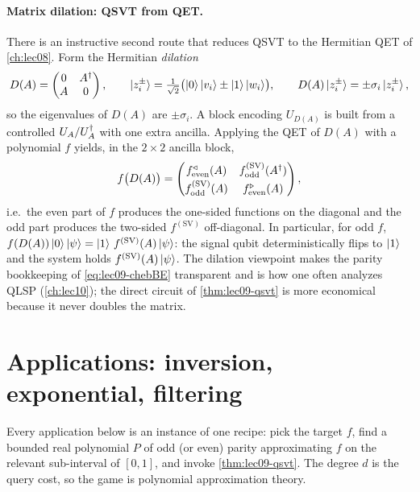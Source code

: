 \paragraph{Matrix dilation: QSVT from QET.}
There is an instructive second route that reduces QSVT to the Hermitian QET of
\cref{ch:lec08}. Form the Hermitian \emph{dilation}
\begin{equation}
  D(A)=\begin{pmatrix}0&A^{\dagger}\\ A&0\end{pmatrix},\qquad
  \ket{z_i^{\pm}}=\tfrac1{\sqrt2}\bigl(\ket0\ket{v_i}\pm\ket1\ket{w_i}\bigr),\qquad
  D(A)\ket{z_i^{\pm}}=\pm\sigma_i\ket{z_i^{\pm}},
  \label{eq:lec09-dilation}
\end{equation}
so the eigenvalues of $D(A)$ are $\pm\sigma_i$. A block encoding $U_{D(A)}$ is built
from a controlled $U_A/U_A^{\dagger}$ with one extra ancilla. Applying the QET of $D(A)$ with a
polynomial $f$ yields, in the $2\times2$ ancilla block,
\begin{equation}
  f\bigl(D(A)\bigr)=\begin{pmatrix}f^{\triangleleft}_{\mathrm{even}}(A)&
     f^{(\mathrm{SV})}_{\mathrm{odd}}(A^{\dagger})\\[2pt]
     f^{(\mathrm{SV})}_{\mathrm{odd}}(A)&f^{\triangleright}_{\mathrm{even}}(A)\end{pmatrix},
  \label{eq:lec09-fdilation}
\end{equation}
i.e.\ the even part of $f$ produces the one-sided functions on the diagonal and the odd
part produces the two-sided $f^{(\mathrm{SV})}$ off-diagonal. In particular, for odd
$f$, $f(D(A))\ket0\ket\psi=\ket1\,f^{(\mathrm{SV})}(A)\ket\psi$: the signal qubit
deterministically flips to $\ket1$ and the system holds $f^{(\mathrm{SV})}(A)\ket\psi$.
The dilation viewpoint makes the parity bookkeeping of \eqref{eq:lec09-chebBE}
transparent and is how one often analyzes QLSP (\cref{ch:lec10}); the direct circuit of
\cref{thm:lec09-qsvt} is more economical because it never doubles the matrix.

\section{Applications: inversion, exponential, filtering}
\label{sec:lec09-3}

Every application below is an instance of one recipe: pick the target $f$, find a
bounded real polynomial $P$ of odd (or even) parity approximating $f$ on the relevant
sub-interval of $[0,1]$, and invoke \cref{thm:lec09-qsvt}. The degree $d$ is the query
cost, so the game is polynomial approximation theory.

